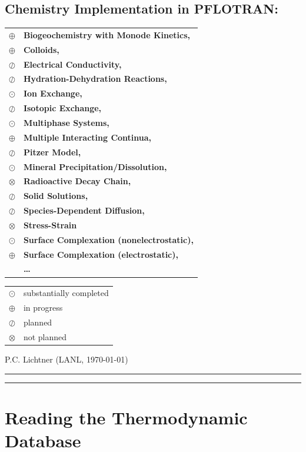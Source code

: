 \documentclass[12pt]{article}
\newcommand{\bcr}{\begin{center}}
\newcommand{\ecr}{\end{center}}
\newcommand{\longline}{\noindent\rule[-0.1in]{\textwidth}{0.01in}}
\begin{document}
\bcr

\section*{Chemistry Implementation in PFLOTRAN:}
\begin{tabular}{ll}
$\oplus$ & \bf\large Biogeochemistry with Monode Kinetics, \\
$\oplus$ & \bf\large Colloids,\\ 
$\oslash$&\bf\large Electrical Conductivity, \\
$\oslash$&\bf\large Hydration-Dehydration Reactions, \\
$\odot$ & \bf\large Ion Exchange, \\
$\oslash$&\bf\large Isotopic Exchange, \\
$\odot$ & \bf\large Multiphase Systems, \\
$\oplus$ & \bf\large Multiple Interacting Continua, \\
$\oslash$& \bf\large Pitzer Model, \\
$\odot$ & \bf\large Mineral Precipitation/Dissolution, \\
$\otimes$ & \bf\large Radioactive Decay Chain, \\
$\oslash$& \bf\large Solid Solutions, \\
$\oslash$& \bf\large Species-Dependent Diffusion, \\
$\otimes$ & \bf\large Stress-Strain\\
$\odot$ & \bf\large Surface Complexation (nonelectrostatic), \\
$\oplus$ & \bf\large Surface Complexation (electrostatic), \\
&\bf\large \ldots
\end{tabular}

\begin{tabular}{ll}\centering
$\odot$ & substantially completed\\
$\oplus$ & in progress\\
$\oslash$ & planned\\
$\otimes$ & not planned
\end{tabular}

\medskip

P.C. Lichtner (LANL, \today)

\ecr

\longline

\tableofcontents

\longline

\section{Reading the Thermodynamic Database}
\end{document}
